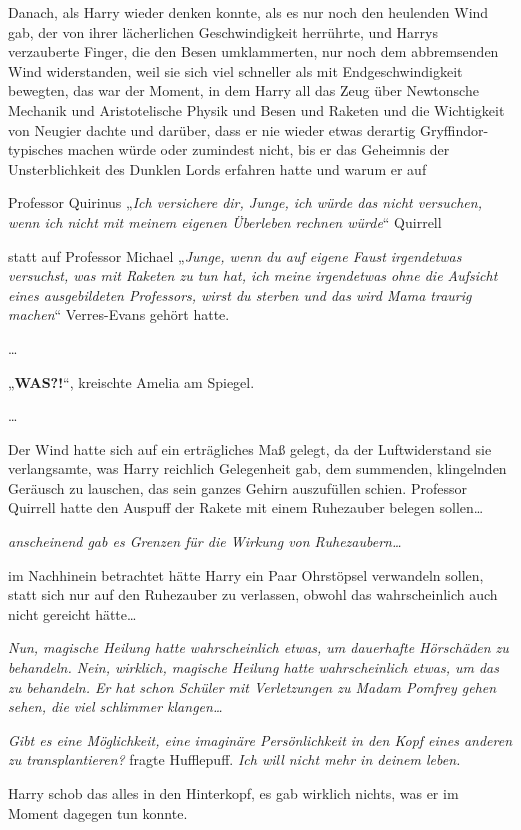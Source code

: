 {Danach, als Harry wieder denken konnte, als es nur noch den heulenden Wind gab, der von ihrer lächerlichen Geschwindigkeit herrührte, und Harrys verzauberte Finger, die den Besen umklammerten, nur noch dem abbremsenden Wind widerstanden, weil sie sich viel schneller als mit Endgeschwindigkeit bewegten, das war der Moment, in dem Harry all das Zeug über Newtonsche Mechanik und Aristotelische Physik und Besen und Raketen und die Wichtigkeit von Neugier dachte und darüber, dass er nie wieder etwas derartig Gryffindor-typisches machen würde oder zumindest nicht, bis er das Geheimnis der Unsterblichkeit des Dunklen Lords erfahren hatte und warum er auf

Professor Quirinus „\emph{Ich versichere dir, Junge, ich würde das nicht versuchen, wenn ich nicht mit meinem eigenen Überleben rechnen würde}“ Quirrell

statt auf Professor Michael „\emph{Junge, wenn du auf eigene Faust irgendetwas versuchst, was mit Raketen zu tun hat, ich meine irgendetwas ohne die Aufsicht eines ausgebildeten Professors, wirst du sterben und das wird Mama traurig machen}“ Verres-Evans gehört hatte.

…

„\textbf{WAS?!}“, kreischte Amelia am Spiegel.

…

Der Wind hatte sich auf ein erträgliches Maß gelegt, da der Luftwiderstand sie verlangsamte, was Harry reichlich Gelegenheit gab, dem summenden, klingelnden Geräusch zu lauschen, das sein ganzes Gehirn auszufüllen schien. Professor Quirrell hatte den Auspuff der Rakete mit einem Ruhezauber belegen sollen…

\emph{anscheinend gab es Grenzen für die Wirkung von Ruhezaubern…}

im Nachhinein betrachtet hätte Harry ein Paar Ohrstöpsel verwandeln sollen, statt sich nur auf den Ruhezauber zu verlassen, obwohl das wahrscheinlich auch nicht gereicht hätte…

\emph{Nun, magische Heilung hatte wahrscheinlich etwas, um dauerhafte Hörschäden zu behandeln. Nein, wirklich, magische Heilung hatte wahrscheinlich etwas, um das zu behandeln. Er hat schon Schüler mit Verletzungen zu Madam Pomfrey gehen sehen, die viel schlimmer klangen…}

\emph{Gibt es eine Möglichkeit, eine imaginäre Persönlichkeit in den Kopf eines anderen zu transplantieren?} fragte Hufflepuff. \emph{Ich will nicht mehr in deinem leben.}

Harry schob das alles in den Hinterkopf, es gab wirklich nichts, was er im Moment dagegen tun konnte.

}
